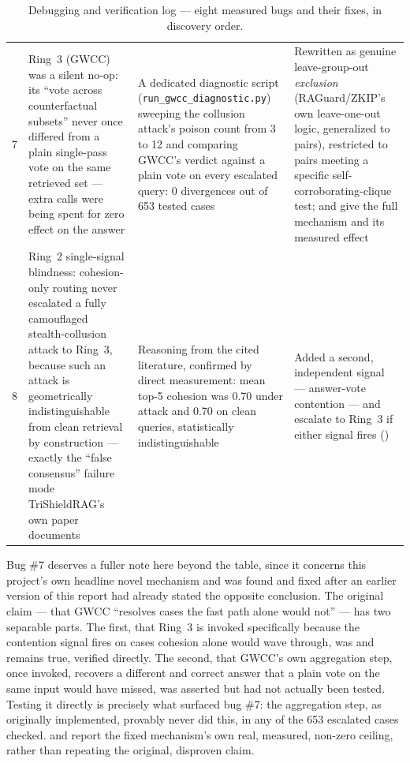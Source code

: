 \begin{table}[htbp]
\begin{tabularx}{\textwidth}{@{}c Y Y Y@{}}
7 & Ring~3 (GWCC) was a silent no-op: its ``vote across counterfactual subsets'' never once differed from a plain single-pass vote on the same retrieved set --- extra calls were being spent for zero effect on the answer & A dedicated diagnostic script (\texttt{run\_gwcc\_diagnostic.py}) sweeping the collusion attack's poison count from 3 to 12 and comparing GWCC's verdict against a plain vote on every escalated query: 0 divergences out of 653 tested cases & Rewritten as genuine leave-group-out \emph{exclusion} (RAGuard/ZKIP's own leave-one-out logic, generalized to pairs), restricted to pairs meeting a specific self-corroborating-clique test;  and  give the full mechanism and its measured effect \\
8 & Ring~2 single-signal blindness: cohesion-only routing never escalated a fully camouflaged stealth-collusion attack to Ring~3, because such an attack is geometrically indistinguishable from clean retrieval by construction --- exactly the ``false consensus'' failure mode TriShieldRAG's own paper documents & Reasoning from the cited literature, confirmed by direct measurement: mean top-5 cohesion was 0.70 under attack and 0.70 on clean queries, statistically indistinguishable & Added a second, independent signal --- answer-vote contention --- and escalate to Ring~3 if either signal fires () \\
\bottomrule
\end{tabularx}
\caption{Debugging and verification log --- eight measured bugs and their fixes, in discovery order.}
\label{tab:debugging}
\end{table}

Bug \#7 deserves a fuller note here beyond the table, since it concerns
this project's own headline novel mechanism and was found and fixed after
an earlier version of this report had already stated the opposite
conclusion. The original claim --- that GWCC ``resolves cases the fast
path alone would not'' --- has two separable parts. The first, that
Ring~3 is invoked specifically because the contention signal fires on
cases cohesion alone would wave through, was and remains true, verified
directly. The second, that GWCC's own aggregation step, once invoked,
recovers a different and correct answer that a plain vote on the same
input would have missed, was asserted but had not actually been tested.
Testing it directly is precisely what surfaced bug \#7: the aggregation
step, as originally implemented, provably never did this, in any of the
653 escalated cases checked.  and 
report the fixed mechanism's own real, measured, non-zero ceiling, rather
than repeating the original, disproven claim.

